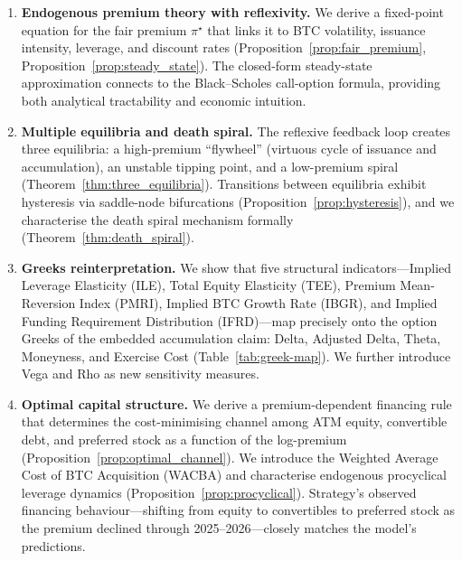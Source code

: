 \begin{enumerate}[leftmargin=*]
  \item \textbf{Endogenous premium theory with reflexivity.}
    We derive a fixed-point equation for the fair premium
    $\pi^\star$ that links it to BTC volatility, issuance intensity,
    leverage, and discount rates (Proposition~\ref{prop:fair_premium},
    Proposition~\ref{prop:steady_state}).  The closed-form steady-state
    approximation connects to the Black--Scholes call-option formula,
    providing both analytical tractability and economic intuition.

  \item \textbf{Multiple equilibria and death spiral.}
    The reflexive feedback loop creates three equilibria: a high-premium
    ``flywheel'' (virtuous cycle of issuance and accumulation), an unstable
    tipping point, and a low-premium spiral
    (Theorem~\ref{thm:three_equilibria}).  Transitions between equilibria
    exhibit hysteresis via saddle-node bifurcations
    (Proposition~\ref{prop:hysteresis}), and we characterise the death
    spiral mechanism formally (Theorem~\ref{thm:death_spiral}).

  \item \textbf{Greeks reinterpretation.}
    We show that five structural indicators---Implied Leverage Elasticity
    (ILE), Total Equity Elasticity (TEE), Premium Mean-Reversion Index
    (PMRI), Implied BTC Growth Rate (IBGR), and Implied Funding
    Requirement Distribution (IFRD)---map precisely onto the option Greeks
    of the embedded accumulation claim: Delta, Adjusted Delta, Theta,
    Moneyness, and Exercise Cost (Table~\ref{tab:greek-map}).  We further
    introduce Vega and Rho as new sensitivity measures.

  \item \textbf{Optimal capital structure.}
    We derive a premium-dependent financing rule that determines the
    cost-minimising channel among ATM equity, convertible debt, and
    preferred stock as a function of the log-premium
    (Proposition~\ref{prop:optimal_channel}).  We introduce the Weighted
    Average Cost of BTC Acquisition (WACBA) and characterise endogenous
    procyclical leverage dynamics (Proposition~\ref{prop:procyclical}).
    Strategy's observed financing behaviour---shifting from equity to
    convertibles to preferred stock as the premium declined through
    2025--2026---closely matches the model's predictions.


\end{enumerate}
